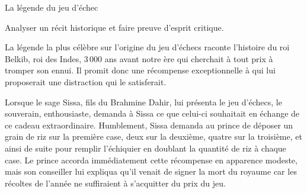 \begin{activity}{La légende du jeu d'échec} \label{echec_et_maths}

\begin{objective}
Analyser un récit historique et faire preuve d'esprit critique.
\end{objective}


La légende la plus célèbre sur l'origine du jeu d'échecs raconte %
l'histoire du roi Belkib, roi des Indes, {3\,000} ans avant notre ère qui %
cherchait à tout prix à tromper son ennui.
 Il promit donc une récompense exceptionnelle à qui lui proposerait une distraction qui le satisferait. 
 
 Lorsque le sage Sissa, fils du Brahmine Dahir, lui présenta le jeu d'échecs, le souverain, enthousiaste, demanda à Sissa ce que celui-ci souhaitait en échange de ce cadeau extraordinaire. 
 Humblement, Sissa demanda au prince de déposer un grain de riz sur la première case, deux sur la deuxième, quatre sur la troisième, et ainsi de suite pour remplir l'échiquier en doublant la quantité de riz à chaque case. 
 Le prince accorda immédiatement cette récompense en apparence modeste, mais son conseiller lui expliqua qu'il venait de signer la mort du royaume car les récoltes de l'année ne suffiraient à s'acquitter du prix du jeu.

\begin{center}
\end{center}

\end{activity}
